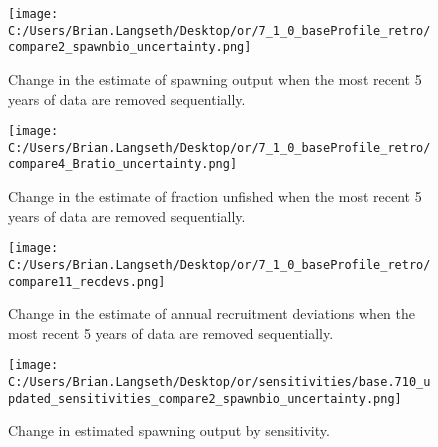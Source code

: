 \documentclass[11pt,
  english,
  a4paper,
]{article}
\begin{document}
\tagmcend\tagstructend


\begin{figure}
\centering
\texttt{[image: C:/Users/Brian.Langseth/Desktop/or/7\_1\_0\_baseProfile\_retro/compare2\_spawnbio\_uncertainty.png]}
\caption{Change in the estimate of spawning output when the most recent 5 years of data are removed sequentially.\label{fig:retro-ssb}}
\end{figure}

\tagmcend\tagstructend


\begin{figure}
\centering
\texttt{[image: C:/Users/Brian.Langseth/Desktop/or/7\_1\_0\_baseProfile\_retro/compare4\_Bratio\_uncertainty.png]}
\caption{Change in the estimate of fraction unfished when the most recent 5 years of data are removed sequentially.\label{fig:retro-depl}}
\end{figure}

\tagmcend\tagstructend


\begin{figure}
\centering
\texttt{[image: C:/Users/Brian.Langseth/Desktop/or/7\_1\_0\_baseProfile\_retro/compare11\_recdevs.png]}
\caption{Change in the estimate of annual recruitment deviations when the most recent 5 years of data are removed sequentially.\label{fig:retro-recdevs}}
\end{figure}

\tagmcend\tagstructend


\begin{figure}
\centering
\texttt{[image: C:/Users/Brian.Langseth/Desktop/or/sensitivities/base.710\_updated\_sensitivities\_compare2\_spawnbio\_uncertainty.png]}
\caption{Change in estimated spawning output by sensitivity.\label{fig:sens-ssb}}
\end{figure}
\end{document}
